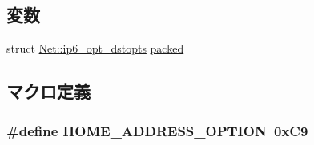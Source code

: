 \subsection*{変数}
\begin{DoxyCompactItemize}
\item 
struct \hyperlink{structNet_1_1ip6__opt__dstopts}{Net::ip6\_\-opt\_\-dstopts} \hyperlink{namespaceNet_a4bfa83470dbd48cb568b3c42fdf1e48d}{packed}
\end{DoxyCompactItemize}


\subsection{マクロ定義}
\hypertarget{inet_8hh_a7a2b87ebb21ea96cd4fcdf7e9511270b}{
\subsubsection[{HOME\_\-ADDRESS\_\-OPTION}]{\setlength{\rightskip}{0pt plus 5cm}\#define HOME\_\-ADDRESS\_\-OPTION~0xC9}}
\label{inet_8hh_a7a2b87ebb21ea96cd4fcdf7e9511270b}
